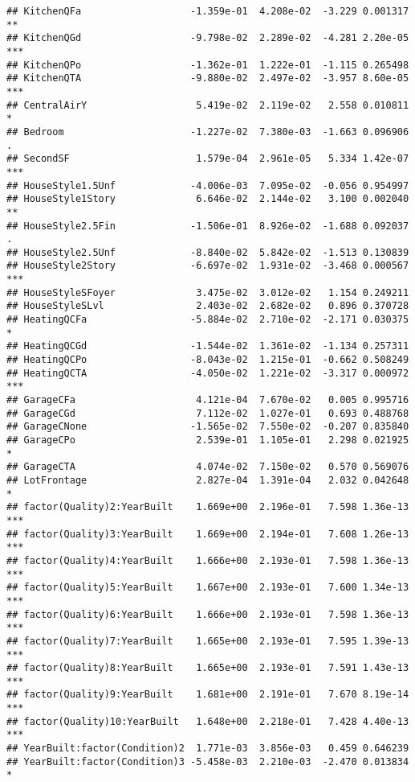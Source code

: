 \documentclass[
]{article}
\begin{document}
\begin{verbatim}
## KitchenQFa                   -1.359e-01  4.208e-02  -3.229 0.001317 ** 
## KitchenQGd                   -9.798e-02  2.289e-02  -4.281 2.20e-05 ***
## KitchenQPo                   -1.362e-01  1.222e-01  -1.115 0.265498    
## KitchenQTA                   -9.880e-02  2.497e-02  -3.957 8.60e-05 ***
## CentralAirY                   5.419e-02  2.119e-02   2.558 0.010811 *  
## Bedroom                      -1.227e-02  7.380e-03  -1.663 0.096906 .  
## SecondSF                      1.579e-04  2.961e-05   5.334 1.42e-07 ***
## HouseStyle1.5Unf             -4.006e-03  7.095e-02  -0.056 0.954997    
## HouseStyle1Story              6.646e-02  2.144e-02   3.100 0.002040 ** 
## HouseStyle2.5Fin             -1.506e-01  8.926e-02  -1.688 0.092037 .  
## HouseStyle2.5Unf             -8.840e-02  5.842e-02  -1.513 0.130839    
## HouseStyle2Story             -6.697e-02  1.931e-02  -3.468 0.000567 ***
## HouseStyleSFoyer              3.475e-02  3.012e-02   1.154 0.249211    
## HouseStyleSLvl                2.403e-02  2.682e-02   0.896 0.370728    
## HeatingQCFa                  -5.884e-02  2.710e-02  -2.171 0.030375 *  
## HeatingQCGd                  -1.544e-02  1.361e-02  -1.134 0.257311    
## HeatingQCPo                  -8.043e-02  1.215e-01  -0.662 0.508249    
## HeatingQCTA                  -4.050e-02  1.221e-02  -3.317 0.000972 ***
## GarageCFa                     4.121e-04  7.670e-02   0.005 0.995716    
## GarageCGd                     7.112e-02  1.027e-01   0.693 0.488768    
## GarageCNone                  -1.565e-02  7.550e-02  -0.207 0.835840    
## GarageCPo                     2.539e-01  1.105e-01   2.298 0.021925 *  
## GarageCTA                     4.074e-02  7.150e-02   0.570 0.569076    
## LotFrontage                   2.827e-04  1.391e-04   2.032 0.042648 *  
## factor(Quality)2:YearBuilt    1.669e+00  2.196e-01   7.598 1.36e-13 ***
## factor(Quality)3:YearBuilt    1.669e+00  2.194e-01   7.608 1.26e-13 ***
## factor(Quality)4:YearBuilt    1.666e+00  2.193e-01   7.598 1.36e-13 ***
## factor(Quality)5:YearBuilt    1.667e+00  2.193e-01   7.600 1.34e-13 ***
## factor(Quality)6:YearBuilt    1.666e+00  2.193e-01   7.598 1.36e-13 ***
## factor(Quality)7:YearBuilt    1.665e+00  2.193e-01   7.595 1.39e-13 ***
## factor(Quality)8:YearBuilt    1.665e+00  2.193e-01   7.591 1.43e-13 ***
## factor(Quality)9:YearBuilt    1.681e+00  2.191e-01   7.670 8.19e-14 ***
## factor(Quality)10:YearBuilt   1.648e+00  2.218e-01   7.428 4.40e-13 ***
## YearBuilt:factor(Condition)2  1.771e-03  3.856e-03   0.459 0.646239    
## YearBuilt:factor(Condition)3 -5.458e-03  2.210e-03  -2.470 0.013834 *  

\end{verbatim}
\end{document}
